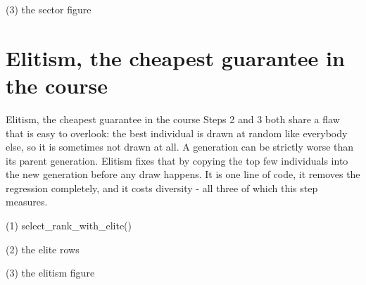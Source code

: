 \begin{frame}[fragile]{(3) the sector figure}

\end{frame}


\section{Elitism, the cheapest guarantee in the course}

\begin{frame}{Elitism, the cheapest guarantee in the course}
Steps 2 and 3 both share a flaw that is easy to overlook: the best individual
is drawn at random like everybody else, so it is sometimes not drawn at all. A
generation can be strictly worse than its parent generation. Elitism fixes that
by copying the top few individuals into the new generation before any draw
happens. It is one line of code, it removes the regression completely, and it
costs diversity - all three of which this step measures.
\end{frame}

\begin{frame}[fragile]{(1) select\_rank\_with\_elite()}

\end{frame}

\begin{frame}[fragile]{(2) the elite rows}

\end{frame}

\begin{frame}[fragile]{(3) the elitism figure}

\end{frame}



